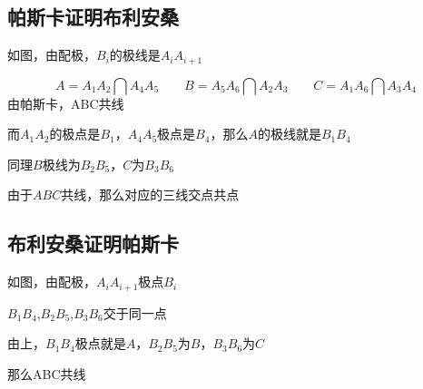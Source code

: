 \documentclass[12pt]{ctexart}
\begin{document}
\subsection{帕斯卡证明布利安桑}
如图，由配极，$B_i$的极线是$A_iA_{i+1}$

\[A=A_1A_2\bigcap A_4A_5 \hspace{2em} B=A_5A_6\bigcap A_2A_3 \hspace{2em} C=A_1A_6\bigcap A_3A_4
\]
由帕斯卡，ABC共线

而$A_1A_2$的极点是$B_1$，$A_4A_5$极点是$B_4$，那么$A$的极线就是$B_1B_4$

同理$B$极线为$B_2B_5$，$C$为$B_3B_6$

由于$ABC$共线，那么对应的三线交点共点
\subsection{布利安桑证明帕斯卡}
如图，由配极，$A_iA_{i+1}$极点$B_i$

$B_1B_4$,$B_2B_5$,$B_3B_6$交于同一点

由上，$B_1B_4$极点就是$A$，$B_2B_5$为$B$，$B_3B_6$为$C$

那么ABC共线
\end{document}
